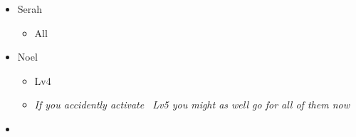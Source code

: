 \begin{menu}
	\begin{itemize}
		\crystarium
		\begin{itemize}
			\item Serah
			      \begin{itemize}
				      \item All \rav
			      \end{itemize}
			\item Noel
			      \begin{itemize}
				      \item \rav Lv4
				      \item \textit{If you accidently activate \rav\ Lv5 you might as well go for all of them now}
			      \end{itemize}
		\end{itemize}
		\paradigm
		\begin{itemize}
			\item {}%
			      {\paradigmline[1]{\textit{\com}}{\textit{\com}}{}{\X}}%
			      {\paradigmline{\textit{\com}}{\com}{}{\X}}%
			      {\paradigmline{\com}{\textit{\rav}}{}{\W}}%
			      {\paradigmline{\sen}{\sen}{}{\W}}%
			      {\paradigmline{\textit{[\rav]}}{\textit{\rav}}{}{\W}}%
			      {\paradigmline{\textit{[\rav]}}{\textit{\rav}}{}{\W}}
		\end{itemize}
	\end{itemize}
\end{menu}




